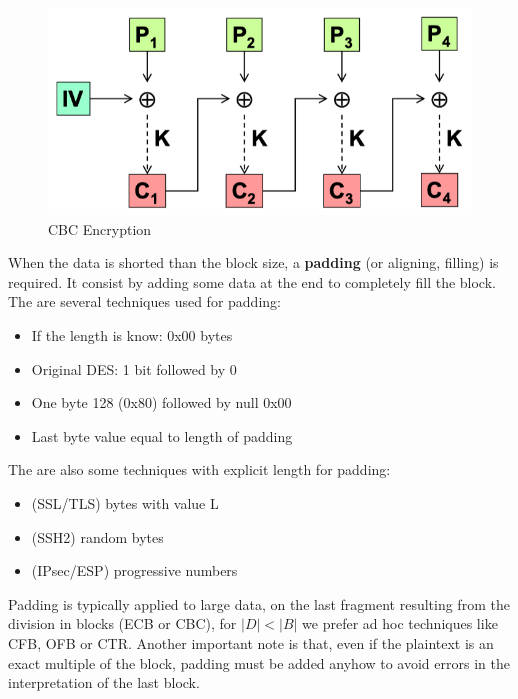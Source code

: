 \documentclass[12pt]{article}
\begin{document}
\begin{figure}[H]
  \centering
  \includegraphics[width=\linewidth]{images/enc_cbc.png}
  \caption{CBC Encryption}
  \label{fig:enc_cbc}
\end{figure}

When the data is shorted than the block size, a \textbf{padding} (or aligning, filling) is required. It consist by adding some data at the end to completely fill the block. The are several techniques used for padding:
\begin{itemize}
  \item If the length is know: 0x00 bytes
  \item Original DES: 1 bit followed by 0
  \item One byte 128 (0x80) followed by null 0x00
  \item Last byte value equal to length of padding
\end{itemize}
 The are also some techniques with explicit length for padding:
 \begin{itemize}
   \item (SSL/TLS) bytes with value L
   \item (SSH2) random bytes
   \item (IPsec/ESP) progressive numbers
 \end{itemize}

Padding is typically applied to large data, on the last fragment resulting from the division in blocks (ECB or CBC), for $|D| < |B|$ we prefer ad hoc techniques like CFB, OFB or CTR. Another important note is that, even if the plaintext is an exact multiple of the block, padding must be added anyhow to avoid errors in the interpretation of the last block.\\
\end{document}
